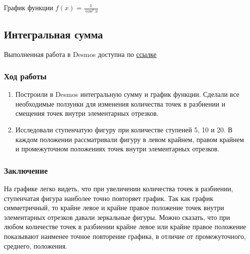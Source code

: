 \documentclass{article}
\begin{document}
\begin{center}
    
    \caption{График функции $f(x) = \frac{1}{\cos^2{x}}$}
    \label{fig:my_label}
\end{center}

\subsection{Интегральная сумма}

Выполненная работа в Desmos доступна по 
\href{https://www.desmos.com/calculator/h7fwirbtli?lang=ru}{ссылке}

\subsubsection*{Ход работы}

\begin{enumerate}
    \item Построили в Desmos интегральную сумму и график функции.
    Сделали все необходимые ползунки для изменения количества точек в разбиении
    и смещения точек внутри элементарных отрезков.
    \item Исследовали ступенчатую фигуру при количестве ступеней 5, 10 и 20. В каждом положении рассматривали фигуру в левом крайнем, правом крайнем и промежуточном положениях точек внутри элементарных отрезков.
\end{enumerate}

\subsubsection*{Заключение}

На графике легко видеть, что при увеличении количества точек в разбиении, ступенчатая фигура наиболее точно повторяет график.
Так как график симметричный, то крайне левое и крайне правое положение точек внутри элементарных отрезков давали зеркальные фигуры. Можно сказать, что при любом количестве точек в разбиении крайне левое или крайне правое положение показывают наименее точное повторение графика, в отличие от промежуточного, среднего, положения.
\end{document}
